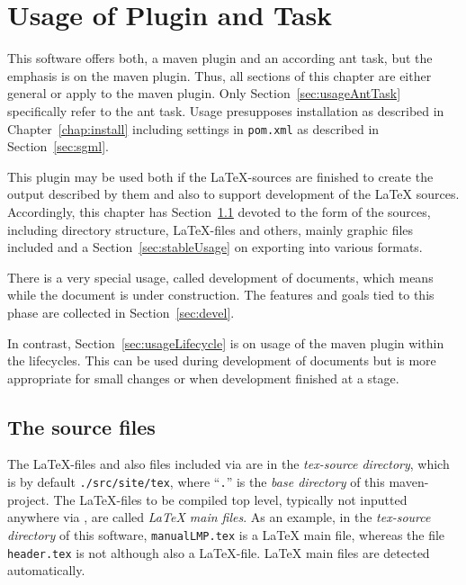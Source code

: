 
\chapter{Usage of Plugin and Task}\label{chap:usage}

This software offers both, a maven plugin and an according ant task,
but the emphasis is on the maven plugin.
Thus, all sections of this chapter are either general
or apply to the maven plugin.
Only Section~\ref{sec:usageAntTask} specifically refer to the ant task. 
Usage presupposes installation as described in Chapter~\ref{chap:install}
including settings in \texttt{pom.xml}
as described in Section~\ref{sec:sgml}.

This plugin may be used both if the \LaTeX-sources are finished 
to create the output described by them 
and also to support development of the \LaTeX{} sources. 
Accordingly, this chapter has Section~\ref{sec:sources}
devoted to the form of the sources, including directory structure,
\LaTeX-files and others, mainly graphic files included
and a Section~\ref{sec:stableUsage} on exporting into various formats.

There is a very special usage, called development of documents,
which means while the document is under construction.
The features and goals tied to this phase
are collected in Section~\ref{sec:devel}.

In contrast, Section~\ref{sec:usageLifecycle}
is on usage of the maven plugin within the lifecycles.
This can be used during development of documents
but is more appropriate for small changes
or when development finished at a stage. 



\section{The source files}\label{sec:sources}

The \LaTeX-files and also files included via  
are in the \emph{tex-source directory}, 
which is by default \texttt{./src/site/tex}, 
where ``\texttt{.}'' is the \emph{base directory} of this maven-project. 
The \LaTeX-files to be compiled top level, 
typically not inputted anywhere via , 
are called \emph{\LaTeX{} main files}. 
As an example, 
in the \emph{tex-source directory} of this software, 
\texttt{manualLMP.tex} is a \LaTeX{} main file, 
whereas the file \texttt{header.tex} is not although also a \LaTeX-file. 
\LaTeX{} main files are detected automatically. 

